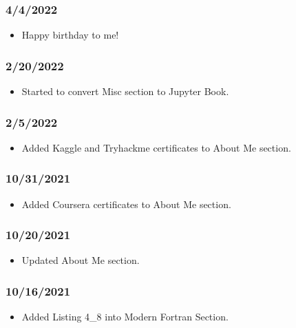 \subsubsection{4/4/2022}

\begin{itemize}
\item Happy birthday to me!
\end{itemize}

\subsubsection{2/20/2022}

\begin{itemize}
\item Started to convert Misc section to Jupyter Book.
\end{itemize}

\subsubsection{2/5/2022}

\begin{itemize}
\item Added Kaggle and Tryhackme certificates to About Me section.
\end{itemize}

\subsubsection{10/31/2021}

\begin{itemize}
\item Added Coursera certificates to About Me section.
\end{itemize}

\subsubsection{10/20/2021}

\begin{itemize}
\item Updated About Me section.
\end{itemize}

\subsubsection{10/16/2021}

\begin{itemize}
\item Added Listing 4\_8 into Modern Fortran Section.
\end{itemize}

